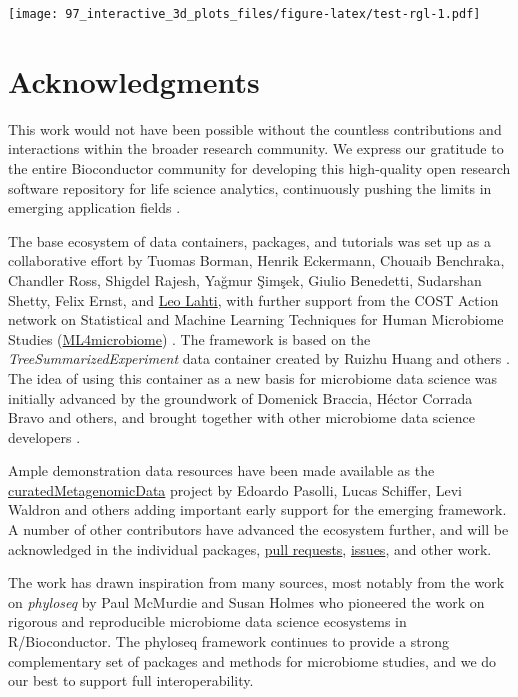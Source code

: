 \documentclass[
]{book}
\begin{document}
\texttt{[image: 97\_interactive\_3d\_plots\_files/figure-latex/test-rgl-1.pdf]}

\hypertarget{acknowledgments}{%
\chapter{Acknowledgments}\label{acknowledgments}}

This work would not have been possible without the countless
contributions and interactions within the broader research
community. We express our gratitude to the entire Bioconductor
community for developing this high-quality open research software
repository for life science analytics, continuously pushing the limits
in emerging application fields \citep[\citet{Huber2015}]{Gentleman2004}.

The base ecosystem of data containers, packages, and tutorials was set
up as a collaborative effort by Tuomas Borman, Henrik Eckermann,
Chouaib Benchraka, Chandler Ross, Shigdel Rajesh, Yağmur Şimşek,
Giulio Benedetti, Sudarshan Shetty, Felix Ernst, and \href{http://www.iki.fi/Leo.Lahti}{Leo
Lahti}, with further support from the
COST Action network on Statistical and Machine Learning Techniques for
Human Microbiome Studies
(\href{https://www.ml4microbiome.eu/}{ML4microbiome})
\citep{MorenoIndias2021}. The framework is based on the
\emph{TreeSummarizedExperiment} data container created by Ruizhu Huang and
others \citep{R-TreeSummarizedExperiment}. The idea of using this container
as a new basis for microbiome data science was initially advanced by
the groundwork of Domenick Braccia, Héctor Corrada Bravo and others,
and brought together with other microbiome data science developers
\citep{Shetty2019}.

Ample demonstration data resources have been made available as the
\href{https://waldronlab.io/curatedMetagenomicData/}{curatedMetagenomicData}
project by Edoardo Pasolli, Lucas Schiffer, Levi Waldron and others
\citep{Pasolli2017} adding important early support for the emerging
framework. A number of other contributors have advanced the ecosystem
further, and will be acknowledged in the individual
packages, \href{https://github.com/microbiome/OMA/graphs/contributors}{pull
requests},
\href{https://github.com/microbiome/OMA/issues}{issues}, and other work.

The work has drawn inspiration from many sources, most notably from
the work on \emph{phyloseq} by Paul McMurdie and Susan Holmes
\citep{McMurdie2013} who pioneered the work on rigorous and reproducible
microbiome data science ecosystems in R/Bioconductor. The phyloseq
framework continues to provide a strong complementary set of packages
and methods for microbiome studies, and we do our best to support full
interoperability.
\end{document}
